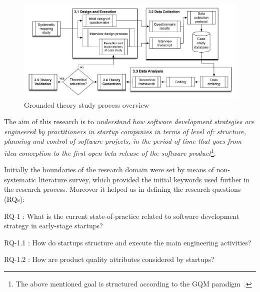 \documentclass[10pt,journal,letterpaper,compsoc]{IEEEtran}
\begin{document}
\begin{figure}[!t] \centering
\includegraphics[width=5in]{figures/completemethodology2} \caption{Grounded
theory study process overview} \label{fig:gt:completemethodology} \end{figure}

The aim of this research is to \textit{understand how software development
strategies are engineered by practitioners in startup companies in terms of
level of: structure, planning and control of software projects, in the period of
time that goes from idea conception to the first open beta release of the
software product}\footnote{The above mentioned goal is structured according to
the GQM paradigm~\cite{Basili1992}.}.

Initially the boundaries of the research domain were set by means of 
non-systematic literature survey, which provided the initial keywords used  
further in the research process. Moreover it helped us in defining the research
questions (RQs):


\begin{compactitem}

\item RQ-1 : What is the current state-of-practice related to software
development strategy in early-stage startups? 

  \begin{compactitem}
  \item RQ-1.1 : How do startups structure and execute the main engineering
    activities? 
  \item RQ-1.2 : How are product quality attributes considered by
    startups? 
  \end{compactitem}

\end{compactitem}
\end{document}
